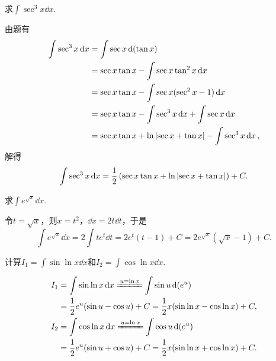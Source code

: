\begin{example}
求\(\int \sec^3 x \dd{x}\).
\begin{solution}
由题有\begin{align*}
\int \sec^3 x \dd{x}
&= \int \sec x \dd(\tan x) \\
&= \sec x \tan x - \int \sec x \tan^2 x \dd{x} \\
&= \sec x \tan x - \int \sec x (\sec^2 x - 1) \dd{x} \\
&= \sec x \tan x - \int \sec^3 x \dd{x} + \int \sec x \dd{x} \\
&= \sec x \tan x + \ln\abs{\sec x + \tan x} - \int \sec^3 x \dd{x},
\end{align*}解得\[
\int \sec^3 x \dd{x}
= \frac{1}{2} \left(
	\sec x \tan x
	+ \ln\abs{\sec x + \tan x}
\right) + C.
\]
\end{solution}
\end{example}

\begin{example}
求\(\int e^{\sqrt{x}} \dd{x}\).
\begin{solution}
令\(t = \sqrt{x}\)，则\(x = t^2\)，\(\dd{x} = 2t\dd{t}\)，于是\[
\int e^{\sqrt{x}} \dd{x}
= 2 \int t e^t \dd{t}
= 2 e^t (t-1) + C
= 2 e^{\sqrt{x}} (\sqrt{x}-1) + C.
\]
\end{solution}
\end{example}

\begin{example}
计算\(I_1 = \int \sin{\ln{x}} \dd{x}\)和\(I_2 = \int \cos{\ln{x}} \dd{x}\).
\begin{solution}
\begin{align*}
I_1
&= \int \sin{\ln x}\dd{x}
\xlongequal{u = \ln x} \int \sin u \dd(e^u) \\
&= \frac{1}{2} e^u (\sin u - \cos u) + C
= \frac{1}{2} x (\sin{\ln x} - \cos{\ln x}) + C, \\
I_2
&= \int \cos{\ln x}\dd{x}
\xlongequal{u = \ln x} \int \cos u \dd(e^u) \\
&= \frac{1}{2} e^u (\sin u + \cos u) + C
= \frac{1}{2} x (\sin{\ln x} + \cos{\ln x}) + C.
\end{align*}
\end{solution}
\end{example}

